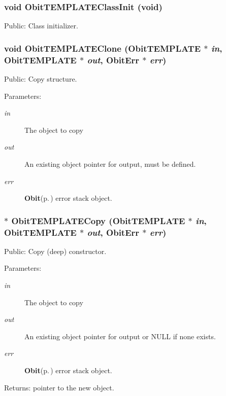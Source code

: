 \subsubsection{\setlength{\rightskip}{0pt plus 5cm}void Obit\-TEMPLATEClass\-Init (void)}\label{ObitTEMPLATE_8h_a4}


Public: Class initializer. 

\subsubsection{\setlength{\rightskip}{0pt plus 5cm}void Obit\-TEMPLATEClone ({\bf Obit\-TEMPLATE} $\ast$ {\em in}, {\bf Obit\-TEMPLATE} $\ast$ {\em out}, {\bf Obit\-Err} $\ast$ {\em err})}\label{ObitTEMPLATE_8h_a9}


Public: Copy structure. 

\begin{Desc}
\item[Parameters:]
\begin{description}
\item[{\em in}]The object to copy \item[{\em out}]An existing object pointer for output, must be defined. \item[{\em err}]{\bf Obit}{\rm (p.\,\pageref{structObit})} error stack object. \end{description}
\end{Desc}
\subsubsection{$\ast$ Obit\-TEMPLATECopy ({\bf Obit\-TEMPLATE} $\ast$ {\em in}, {\bf Obit\-TEMPLATE} $\ast$ {\em out}, {\bf Obit\-Err} $\ast$ {\em err})}\label{ObitTEMPLATE_8h_a8}


Public: Copy (deep) constructor. 

\begin{Desc}
\item[Parameters:]
\begin{description}
\item[{\em in}]The object to copy \item[{\em out}]An existing object pointer for output or NULL if none exists. \item[{\em err}]{\bf Obit}{\rm (p.\,\pageref{structObit})} error stack object. \end{description}
\end{Desc}
\begin{Desc}
\item[Returns:]pointer to the new object. \end{Desc}
